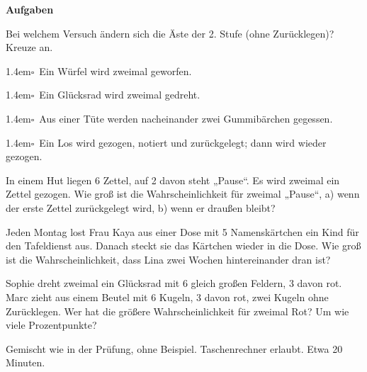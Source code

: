 \documentclass[11pt]{article}
\newcommand{\kreuzl}[1]{\par\hangindent1.4em\hangafter1\noindent$\square$\ #1}
\newcommand{\aufg}[3]{\par\noindent\makebox[0pt][r]{#3}\begin{minipage}[t]{\linewidth}#1\end{minipage}\par}
\newcommand{\nr}[1]{\makebox[7mm][l]{\textbf{#1}}}
\newlength{\kr}
\begin{document}
\noindent\textbf{Aufgaben}\par\smallskip
\aufg{\nr{1.}Bei welchem Versuch ändern sich die Äste der 2. Stufe (ohne Zurücklegen)? Kreuze an.\par\smallskip\leftskip7mm \kreuzl{Ein Würfel wird zweimal geworfen.}\kreuzl{Ein Glücksrad wird zweimal gedreht.}\kreuzl{Aus einer Tüte werden nacheinander zwei Gummibärchen gegessen.}\kreuzl{Ein Los wird gezogen, notiert und zurückgelegt; dann wird wieder gezogen.}}{}{}
\medskip
\aufg{\nr{2.}In einem Hut liegen 6 Zettel, auf 2 davon steht „Pause“. Es wird zweimal ein Zettel gezogen. Wie groß ist die Wahrscheinlichkeit für zweimal „Pause“, a) wenn der erste Zettel zurückgelegt wird, b) wenn er draußen bleibt?}{}{}
\medskip
\aufg{\nr{3.}Jeden Montag lost Frau Kaya aus einer Dose mit 5 Namenskärtchen ein Kind für den Tafeldienst aus. Danach steckt sie das Kärtchen wieder in die Dose. Wie groß ist die Wahrscheinlichkeit, dass Lina zwei Wochen hintereinander dran ist?}{}{}
\medskip
\aufg{\nr{4.}Sophie dreht zweimal ein Glücksrad mit 6 gleich großen Feldern, 3 davon rot. Marc zieht aus einem Beutel mit 6 Kugeln, 3 davon rot, zwei Kugeln ohne Zurücklegen. Wer hat die größere Wahrscheinlichkeit für zweimal Rot? Um wie viele Prozentpunkte?}{}{{\scriptsize\color{mbgrau}Ziel\hspace{2mm}}}
\medskip
\par\vspace{3mm}\setlength{\kr}{\dimexpr\pagegoal-\pagetotal-10mm\relax}%
\ifdim\kr>12mm\noindent{\scriptsize\color{mbgrau}Platz zum Rechnen}\par\nointerlineskip\vspace{1mm}\noindent
\begin{tikzpicture}\clip (0,0) rectangle ({\linewidth-0.5mm},\kr);\draw[black!16,line width=0.3pt,step=5mm] (0,0) grid (\linewidth,\kr);\end{tikzpicture}\fi\par
\clearpage\label{s:T}\noindent\colorbox{black!12}{}\hspace{3mm}{\Large\bfseries Probetest}\par\smallskip
\noindent Gemischt wie in der Prüfung, ohne Beispiel. Taschenrechner erlaubt. Etwa 20 Minuten.\par\medskip
\end{document}
